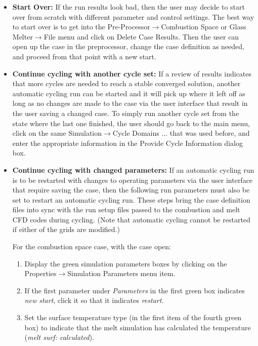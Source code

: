 \documentclass[12pt]{article}
\newcommand{\menu}[1]{\textsf{#1}}
\newcommand{\smenu}[2]{\textsf{#1$\to$#2}}
\newcommand{\ssmenu}[3]{\textsf{#1$\to$#2$\to$#3}}
\newcommand{\parm}[1]{\textit{#1}}
\newcommand{\dialog}[1]{\textsf{#1}}
\numberwithin{equation}{section}
\begin{document}
\begin{itemize}
	\item \textbf{Start Over:} If the run results look bad, then the user may decide to start over from scratch with different parameter and control settings. The best way to start over is to get into the \ssmenu{Pre-Processor}{Combustion Space or Glass Melter}{File} menu and click on \menu{Delete Case Results}. Then the user can open up the case in the preprocessor, change the case definition as needed, and proceed from that point with a new start.
	\item \textbf{Continue cycling with another cycle set:} If a review of results indicates that more cycles are needed to reach a stable converged solution, another automatic cycling run can be started and it will pick up where it left off as long as no changes are made to the case via the user interface that result in the user saving a changed case. To simply run another cycle set from the state where the last one finished, the user should go back to the main menu, click on the same \smenu{Simulation}{Cycle Domains ...} that was used before, and enter the appropriate information in the \dialog{Provide Cycle Information} dialog box. 
	\item  \textbf{Continue cycling with changed parameters:} If an automatic cycling run is to be restarted with changes to operating parameters via the user interface that require saving the case, then the following run parameters must also be set to restart an automatic cycling run. These steps bring the case definition files into sync with the run setup files passed to the combustion and melt CFD codes during cycling. (Note that automatic cycling cannot be restarted if either of the grids are modified.)
 
For the combustion space case, with the case open:
	\begin{enumerate}
	    \item Display the green simulation parameters boxes by clicking on the\\ \smenu{Properties}{Simulation Parameters} menu item.
	    \item If the first parameter under \parm{Parameters} in the first green box indicates \parm{new start}, click it so that it indicates \parm{restart}.
	    \item Set the surface temperature type (in the first item of the fourth green box) to indicate that the melt simulation has calculated the temperature (\parm{melt surf: calculated}).
	\end{enumerate}


\end{itemize}
\end{document}
